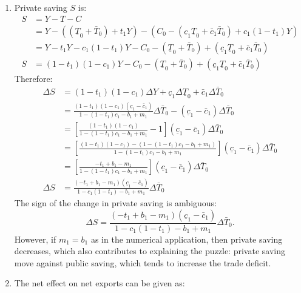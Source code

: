 \documentclass[]{book}
\begin{document}
\begin{enumerate}
\def\labelenumi{\arabic{enumi}.}
\setcounter{enumi}{4}
\item
  Private saving \(S\) is: \[
  \begin{aligned}
  S &= Y-T-C\\
  &=Y-\left(\left(\underline{T}_{0}+\bar{T}_{0}\right)+t_1 Y\right) - \left(C_0 -\left(\underline{c}_{1}\underline{T}_0+\bar{c}_{1}\bar{T}_0\right)+c_1 (1-t_1) Y\right)\\
  &=Y - t_1 Y - c_1(1-t_1)Y-C_0 - \left(\underline{T}_{0}+\bar{T}_{0}\right)+\left(\underline{c}_{1}\underline{T}_0+\bar{c}_{1}\bar{T}_0\right)\\
  S&=(1-t_1)(1-c_1)Y-C_0 - \left(\underline{T}_{0}+\bar{T}_{0}\right)+\left(\underline{c}_{1}\underline{T}_0+\bar{c}_{1}\bar{T}_0\right)
  \end{aligned}
  \] Therefore: \[
  \begin{aligned}
  \Delta S &= (1-t_1)(1-c_1)\Delta Y + \underline{c}_{1}\Delta \underline{T}_0+\bar{c}_{1}\Delta \bar{T}_0\\
  &=\frac{(1-t_1)(1-c_1)\left(\underline{c}_{1}-\bar{c}_{1}\right)}{1-\left(1-t_{1}\right)c_{1}-b_{1}+m_1}\Delta\bar{T}_{0}-(\underline{c}_1-\bar{c}_1)\Delta \bar{T}_0\\
  &=\left[\frac{(1-t_1)(1-c_1)}{1-\left(1-t_{1}\right)c_{1}-b_{1}+m_1}-1\right](\underline{c}_1-\bar{c}_1)\Delta \bar{T}_0\\
  &=\left[\frac{(1-t_1)(1-c_1)-\left(1-\left(1-t_{1}\right)c_{1}-b_{1}+m_1\right)}{1-\left(1-t_{1}\right)c_{1}-b_{1}+m_1}\right](\underline{c}_1-\bar{c}_1)\Delta \bar{T}_0\\
  &=\left[\frac{-t_1+b_1-m_1}{1-\left(1-t_{1}\right)c_{1}-b_{1}+m_1}\right](\underline{c}_1-\bar{c}_1)\Delta \bar{T}_0\\
  \Delta S&=\frac{(-t_1+b_1-m_1)\left(\underline{c}_{1}-\bar{c}_{1}\right)}{1-c_1(1-t_1)-b_1+m_1}\Delta \bar{T}_0
  \end{aligned}
  \] The sign of the change in private saving is ambiguous:
  \[\boxed{\Delta S=\frac{(-t_1+b_1-m_1)\left(\underline{c}_{1}-\bar{c}_{1}\right)}{1-c_1(1-t_1)-b_1+m_1}\Delta \bar{T}_0}.\]
  However, if \(m_1=b_1\) as in the numerical application, then private
  saving decreases, which also contributes to explaining the puzzle:
  private saving move against public saving, which tends to increase the
  trade deficit.
\item
  The net effect on net exports can be given as: \[
  \begin{aligned}

\end{aligned}\]
\end{enumerate}
\end{document}
